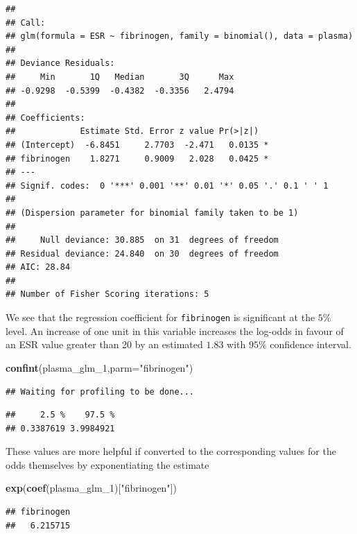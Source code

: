 \documentclass[]{article}
\newenvironment{Shaded}{\begin{snugshade}}{\end{snugshade}}
\newcommand{\KeywordTok}[1]{\textcolor[rgb]{0.13,0.29,0.53}{\textbf{{#1}}}}
\newcommand{\DataTypeTok}[1]{\textcolor[rgb]{0.13,0.29,0.53}{{#1}}}
\newcommand{\StringTok}[1]{\textcolor[rgb]{0.31,0.60,0.02}{{#1}}}
\newcommand{\NormalTok}[1]{{#1}}
\numberwithin{equation}{section}
\begin{document}
\begin{verbatim}
## 
## Call:
## glm(formula = ESR ~ fibrinogen, family = binomial(), data = plasma)
## 
## Deviance Residuals: 
##     Min       1Q   Median       3Q      Max  
## -0.9298  -0.5399  -0.4382  -0.3356   2.4794  
## 
## Coefficients:
##             Estimate Std. Error z value Pr(>|z|)  
## (Intercept)  -6.8451     2.7703  -2.471   0.0135 *
## fibrinogen    1.8271     0.9009   2.028   0.0425 *
## ---
## Signif. codes:  0 '***' 0.001 '**' 0.01 '*' 0.05 '.' 0.1 ' ' 1
## 
## (Dispersion parameter for binomial family taken to be 1)
## 
##     Null deviance: 30.885  on 31  degrees of freedom
## Residual deviance: 24.840  on 30  degrees of freedom
## AIC: 28.84
## 
## Number of Fisher Scoring iterations: 5
\end{verbatim}

We see that the regression coefficient for \texttt{fibrinogen} is
significant at the \(5\%\) level. An increase of one unit in this
variable increases the log-odds in favour of an ESR value greater than
20 by an estimated \(1.83\) with \(95\%\) confidence interval.

\begin{Shaded}
\begin{Highlighting}[]
\KeywordTok{confint}\NormalTok{(plasma_glm_1,}\DataTypeTok{parm=}\StringTok{"fibrinogen"}\NormalTok{)}
\end{Highlighting}
\end{Shaded}

\begin{verbatim}
## Waiting for profiling to be done...
\end{verbatim}

\begin{verbatim}
##     2.5 %    97.5 % 
## 0.3387619 3.9984921
\end{verbatim}

These values are more helpful if converted to the corresponding values
for the odds themselves by exponentiating the estimate

\begin{Shaded}
\begin{Highlighting}[]
\KeywordTok{exp}\NormalTok{(}\KeywordTok{coef}\NormalTok{(plasma_glm_1)[}\StringTok{"fibrinogen"}\NormalTok{])}
\end{Highlighting}
\end{Shaded}

\begin{verbatim}
## fibrinogen 
##   6.215715
\end{verbatim}
\end{document}
